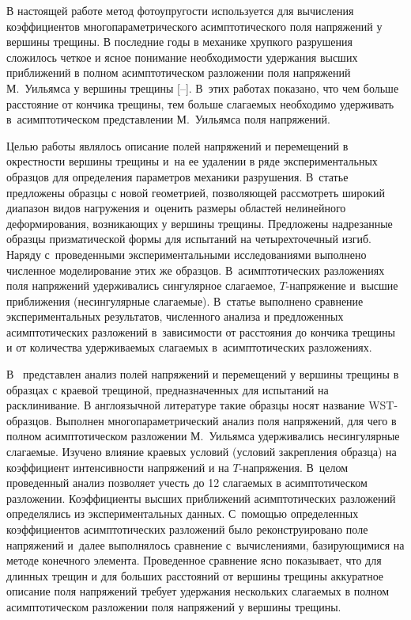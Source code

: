 В настоящей работе метод фотоупругости используется для вычисления коэффициентов многопараметрического асимптотического поля напряжений у вершины трещины. В последние годы в механике хрупкого разрушения сложилось четкое и ясное понимание необходимости удержания высших приближений в полном асимптотическом разложении поля напряжений М.~Уильямса у вершины трещины [--].  
В~этих работах показано, что чем больше расстояние от кончика трещины, тем больше слагаемых необходимо удерживать в~асимптотическом представлении М.~Уильямса  поля напряжений.

Целью работы  \cite{Ves} являлось описание полей напряжений и перемещений в окрестности вершины трещины и~на ее удалении в ряде экспериментальных образцов для определения параметров механики разрушения. 
В~статье предложены образцы с новой геометрией, позволяющей рассмотреть широкий диапазон видов нагружения и~оценить размеры областей нелинейного деформирования, возникающих у вершины трещины. 
Предложены надрезанные образцы призматической формы для испытаний на четырехточечный изгиб. 
Наряду с~проведенными экспериментальными исследованиями выполнено численное моделирование этих же образцов. 
В~асимптотических разложениях поля напряжений удерживались сингулярное слагаемое, $T$-напряжение и~высшие приближения (несингулярные слагаемые). 
В~статье выполнено сравнение экспериментальных результатов, численного анализа и предложенных асимптотических разложений в~зависимости от расстояния до кончика трещины и от количества удерживаемых слагаемых в~асимптотических разложениях.

В~\cite{Vese} представлен анализ полей напряжений и перемещений у вершины трещины в образцах с краевой трещиной, предназначенных для испытаний на расклинивание. В англоязычной литературе такие образцы носят название WST-образцов. 
Выполнен многопараметрический анализ поля напряжений, для чего в полном асимптотическом разложении М.~Уильямса удерживались несингулярные слагаемые. 
Изучено влияние краевых условий (условий закрепления образца) на коэффициент интенсивности напряжений и на $T$-напряжения. 
В~целом проведенный анализ позволяет учесть до 12 слагаемых в асимптотическом разложении.  
Коэффициенты высших приближений  асимптотических разложений определялись из экспериментальных данных. 
С~помощью определенных коэффициентов асимптотических разложений было реконструировано поле напряжений и~далее выполнялось сравнение с~вычислениями, базирующимися на методе конечного элемента. 
Проведенное сравнение ясно показывает, что для длинных трещин и для больших расстояний от вершины трещины аккуратное описание поля напряжений требует удержания нескольких слагаемых в полном асимптотическом разложении поля напряжений у вершины трещины.


